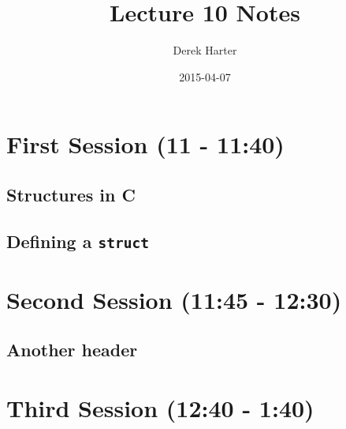 \documentclass[11pt]{article}
\title{Lecture 10 Notes}
\author{Derek Harter}
\date{2015-04-07}
\begin{document}
\maketitle


\section{First Session (11 - 11:40)}
\label{sec-1}
\subsection{Structures in C}
\label{sec-1-1}
\subsection{Defining a \verb~struct~}
\label{sec-1-2}
\section{Second Session (11:45 - 12:30)}
\label{sec-2}
\subsection{Another header}
\label{sec-2-1}
\section{Third Session (12:40 - 1:40)}
\label{sec-3}
\end{document}
